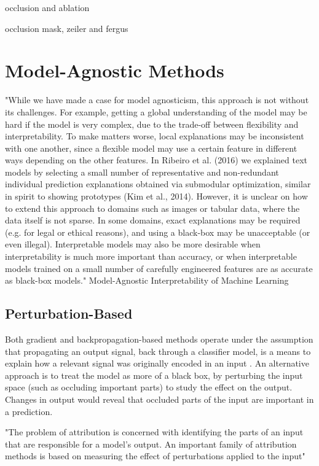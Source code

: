 \documentclass[main]{subfiles}
\begin{document}
occlusion and ablation

occlusion mask, zeiler and fergus

\section{Model-Agnostic Methods}


"While we have made a case for model agnosticism, this
approach is not without its challenges. For example,
getting a global understanding of the model may be hard
if the model is very complex, due to the trade-off between
flexibility and interpretability. To make matters worse, local
explanations may be inconsistent with one another, since a
flexible model may use a certain feature in different ways
depending on the other features. In Ribeiro et al. (2016)
we explained text models by selecting a small number
of representative and non-redundant individual prediction
explanations obtained via submodular optimization, similar
in spirit to showing prototypes (Kim et al., 2014). However,
it is unclear on how to extend this approach to domains such
as images or tabular data, where the data itself is not sparse.
In some domains, exact explanations may be required (e.g.
for legal or ethical reasons), and using a black-box may
be unacceptable (or even illegal). Interpretable models
may also be more desirable when interpretability is much
more important than accuracy, or when interpretable models
trained on a small number of carefully engineered features
are as accurate as black-box models."  Model-Agnostic Interpretability of Machine Learning



\subsection{Perturbation-Based}
Both gradient and backpropagation-based methods operate under the assumption that propagating an output signal, back through a classifier model, is a means to explain how a relevant signal was originally encoded in an input \cite{patternnet}. An alternative approach is to treat the model as more of a black box, by perturbing the input space (such as occluding important parts) to study the effect on the output. Changes in output would reveal that occluded parts of the input are important in a prediction. 

"The problem of attribution is concerned with identifying the parts of an input that are responsible for a model's output. An important family of attribution methods is based on measuring the effect of perturbations applied to the input"
\end{document}
